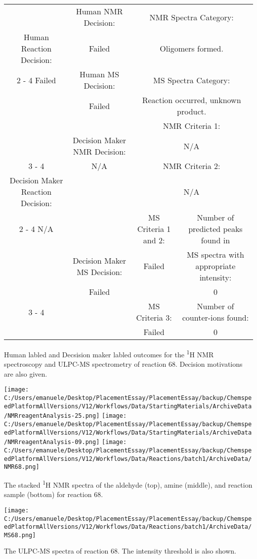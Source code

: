 \documentclass{article}%
\begin{document}
\begin{Decision Table}[H]%
\begin{tabular}{|c|c|c|c|}%
\hline%
&Human NMR Decision:&\multicolumn{2}{|c|}{NMR Spectra Category:}\\%
Human Reaction Decision:&Failed&\multicolumn{2}{|c|}{Oligomers formed.}\\%
\cline{2%
-%
4}%
Failed&Human MS Decision:&\multicolumn{2}{|c|}{MS Spectra Category:}\\%
&Failed&\multicolumn{2}{|c|}{Reaction occurred, unknown product.}\\%
\hline%
&&\multicolumn{2}{|c|}{NMR Criteria 1:}\\%
&Decision Maker NMR Decision:&\multicolumn{2}{|c|}{N/A}\\%
\cline{3%
-%
4}%
&N/A&\multicolumn{2}{|c|}{NMR Criteria 2:}\\%
Decision Maker Reaction Decision:&&\multicolumn{2}{|c|}{N/A}\\%
\cline{2%
-%
4}%
N/A&&MS Criteria 1 and 2:&Number of predicted peaks found in\\%
&Decision Maker MS Decision:&Failed&MS spectra with appropriate intensity:\\%
&Failed&&0\\%
\cline{3%
-%
4}%
&&MS Criteria 3:&Number of counter{-}ions found:\\%
&&Failed&0\\%
\hline%
\end{tabular}%
\caption{Human labled and Decsision maker labled outcomes for the \textsuperscript{1}H NMR spectroscopy and ULPC-MS spectrometry of reaction 68. Decision motivations are also given.}%
\end{Decision Table}%
\begin{NMR Spectra}[H]%
\begin{center}%
\texttt{[image: C:/Users/emanuele/Desktop/PlacementEssay/PlacementEssay/backup/ChemspeedPlatformAllVersions/V12/Workflows/Data/StartingMaterials/ArchiveData/NMRreagentAnalysis-25.png]}\hfill%
\texttt{[image: C:/Users/emanuele/Desktop/PlacementEssay/PlacementEssay/backup/ChemspeedPlatformAllVersions/V12/Workflows/Data/StartingMaterials/ArchiveData/NMRreagentAnalysis-09.png]}\hfill%
\texttt{[image: C:/Users/emanuele/Desktop/PlacementEssay/PlacementEssay/backup/ChemspeedPlatformAllVersions/V12/Workflows/Data/Reactions/batch1/ArchiveData/NMR68.png]}\hfill%
\end{center}%
\caption{The stacked \textsuperscript{1}H NMR spectra of the aldehyde (top), amine (middle), and reaction sample (bottom) for reaction 68.}%
\end{NMR Spectra}%
\begin{MS Spectra}[H]%
\begin{center}%
\texttt{[image: C:/Users/emanuele/Desktop/PlacementEssay/PlacementEssay/backup/ChemspeedPlatformAllVersions/V12/Workflows/Data/Reactions/batch1/ArchiveData/MS68.png]}\hfill%
\end{center}%
\caption{The ULPC-MS spectra of reaction 68. The intensity threshold is also shown.}%
\end{MS Spectra}%
\end{document}
